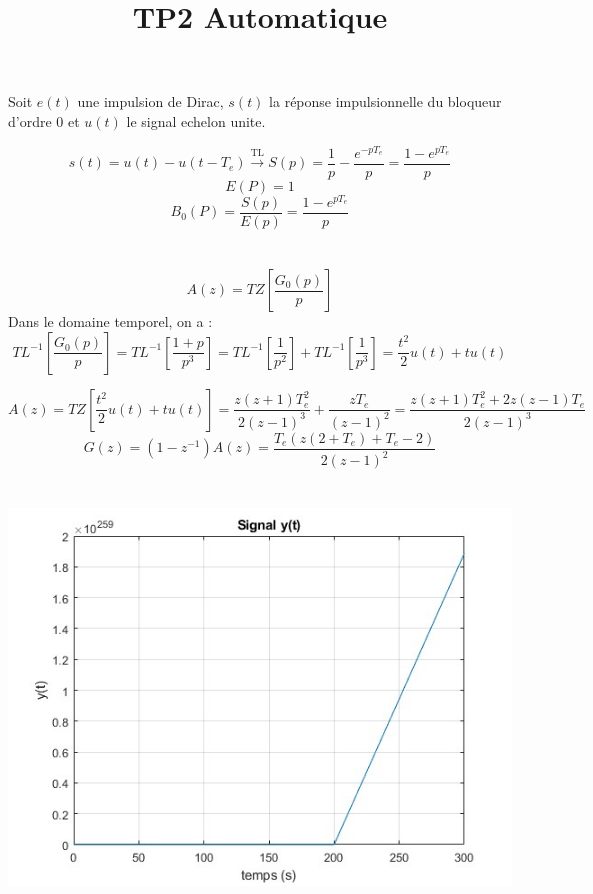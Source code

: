 \documentclass[14pt]{extarticle}
\title{TP2 Automatique}
\begin{document}
\maketitle


\section{}

Soit $e(t)$ une impulsion de Dirac, $s(t)$ la réponse impulsionnelle du bloqueur d'ordre 0 et $u(t)$ le signal echelon unite. 


\[ s(t) = u(t) - u(t-T_e) \xrightarrow{\text{TL}} S(p) = \frac{1}{p} - \frac{e^{-pT_e}}{p} = \frac{1-e^{pT_e}}{p}\]
\[E(P) = 1\] 
\[B_0(P) = \frac{S(p)}{E(p)} = \frac{1-e^{pT_e}}{p}\] 


\section{}
\[A(z) = TZ[\frac{G_0(p)}{p}]\]
Dans le domaine temporel, on a :
\[TL^{-1}[\frac{G_0(p)}{p}] = TL^{-1}[\frac{1+p}{p^3}] = TL^{-1}[\frac{1}{p^2}] + TL^{-1}[\frac{1}{p^3}] = \frac{t^2}{2}u(t) + tu(t)\]

\[A(z) = TZ[\frac{t^2}{2}u(t) + tu(t)] = \frac{z(z+1)T_{e}^2}{2(z-1)^3} + \frac{zT_e}{(z-1)^2} = \frac{z(z+1)T_e^2+2z(z-1)T_e}{2(z-1)^3}\] 
\[G(z)= (1-z^{-1})A(z) = \frac{T_e(z(2+T_e)+T_e -2)}{2(z-1)^2}\]

\section{}

\includegraphics{untitled.jpg}
\end{document}
